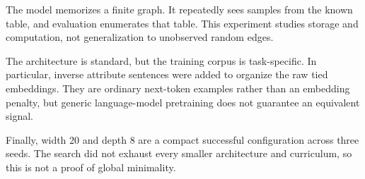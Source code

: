 \documentclass[11pt]{article}
\begin{document}
The model memorizes a finite graph.  It repeatedly sees samples from the known
table, and evaluation enumerates that table.  This experiment studies storage
and computation, not generalization to unobserved random edges.

The architecture is standard, but the training corpus is task-specific.  In
particular, inverse attribute sentences were added to organize the raw tied
embeddings.  They are ordinary next-token examples rather than an embedding
penalty, but generic language-model pretraining does not guarantee an
equivalent signal.

Finally, width 20 and depth 8 are a compact successful configuration across
three seeds.  The search did not exhaust every smaller architecture and
curriculum, so this is not a proof of global minimality.
\end{document}
